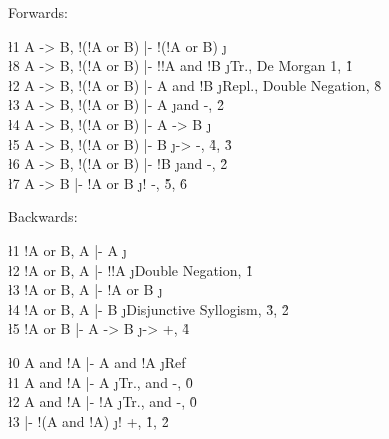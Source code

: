 \documentclass[class=cs245,notes,leqno]{agony}
\begin{document}
\begin{theorem}[Implication]
\end{theorem}
\begin{prf}
  Forwards:
  \begin{deduce}
    \l1 A -> B, !(!A or B) |- !(!A or B) \j {\E}                          \\
    \l8 A -> B, !(!A or B) |- !!A and !B \j {Tr., De Morgan 1, \r1}       \\
    \l2 A -> B, !(!A or B) |- A and !B   \j {Repl., Double Negation, \r8} \\
    \l3 A -> B, !(!A or B) |- A          \j {and -, \r2}                  \\
    \l4 A -> B, !(!A or B) |- A -> B     \j {\E}                          \\
    \l5 A -> B, !(!A or B) |- B          \j {-> -, \r4, \r3}              \\
    \l6 A -> B, !(!A or B) |- !B         \j {and -, \r2}                  \\
    \l7 A -> B             |- !A or B    \j {! -, \r5, \r6}
  \end{deduce}
  Backwards:
  \begin{deduce}
    \l1 !A or B, A |- A       \j {\E}                              \\
    \l2 !A or B, A |- !!A     \j {Double Negation, \r1}            \\
    \l3 !A or B, A |- !A or B \j {\E}                              \\
    \l4 !A or B, A |- B       \j {Disjunctive Syllogism, \r3, \r2} \\
    \l5 !A or B    |- A -> B  \j {-> +, \r4}
  \end{deduce}
\end{prf}

\begin{theorem}
\end{theorem}
\begin{prf}
  \begin{deduce}
    \l0 A and !A |- A and !A    \j {Ref}             \\
    \l1 A and !A |- A           \j {Tr., and -, \r0} \\
    \l2 A and !A |- !A          \j {Tr., and -, \r0} \\
    \l3 \0       |- !(A and !A) \j {! +, \r1, \r2}
  \end{deduce}
\end{prf}
\end{document}
